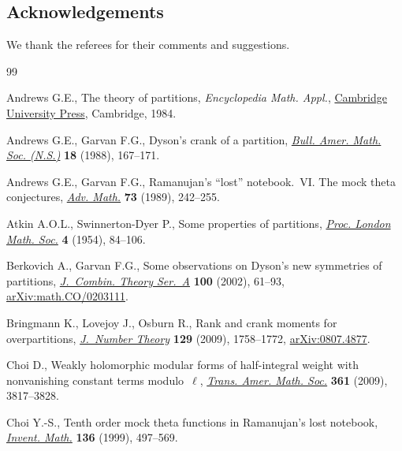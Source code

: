 \documentclass[10pt,a4paper]{amsart}
\numberwithin{equation}{section}
\begin{document}
\subsection*{Acknowledgements}
We thank the referees for their comments and suggestions.


\begin{thebibliography}{99}
\footnotesize\itemsep=0pt

Andrews G.E., The theory of partitions, \textit{Encyclopedia Math. Appl.}, \href{https://doi.org/10.1017/CBO9780511608650}{Cambridge University Press}, Cambridge, 1984.

Andrews G.E., Garvan F.G., Dyson's crank of a partition, \href{https://doi.org/10.1090/S0273-0979-1988-15637-6}{\textit{Bull. Amer.
  Math. Soc. (N.S.)}} \textbf{18} (1988), 167--171.

Andrews G.E., Garvan F.G., Ramanujan's ``lost'' notebook.~{VI}. {T}he mock
  theta conjectures, \href{https://doi.org/10.1016/0001-8708(89)90070-4}{\textit{Adv. Math.}} \textbf{73} (1989), 242--255.

Atkin A.O.L., Swinnerton-Dyer P., Some properties of partitions, \href{https://doi.org/10.1112/plms/s3-4.1.84}{\textit{Proc.
  London Math. Soc.}} \textbf{4} (1954), 84--106.

Berkovich A., Garvan F.G., Some observations on {D}yson's new symmetries of
  partitions, \href{https://doi.org/10.1006/jcta.2002.3281}{\textit{J.~Combin. Theory Ser.~A}} \textbf{100} (2002), 61--93,
  \href{https://arxiv.org/abs/math.CO/0203111}{arXiv:math.CO/0203111}.

Bringmann K., Lovejoy J., Osburn R., Rank and crank moments for overpartitions,
  \href{https://doi.org/10.1016/j.jnt.2008.10.017}{\textit{J.~Number Theory}} \textbf{129} (2009), 1758--1772,
  \href{https://arxiv.org/abs/0807.4877}{arXiv:0807.4877}.

Choi D., Weakly holomorphic modular forms of half-integral weight with
  nonvanishing constant terms modulo~$\ell$, \href{https://doi.org/10.1090/S0002-9947-09-04708-4}{\textit{Trans. Amer. Math. Soc.}}
  \textbf{361} (2009), 3817--3828.

Choi Y.-S., Tenth order mock theta functions in {R}amanujan's lost notebook,
  \href{https://doi.org/10.1007/s002220050318}{\textit{Invent. Math.}} \textbf{136} (1999), 497--569.


\end{thebibliography}
\end{document}
